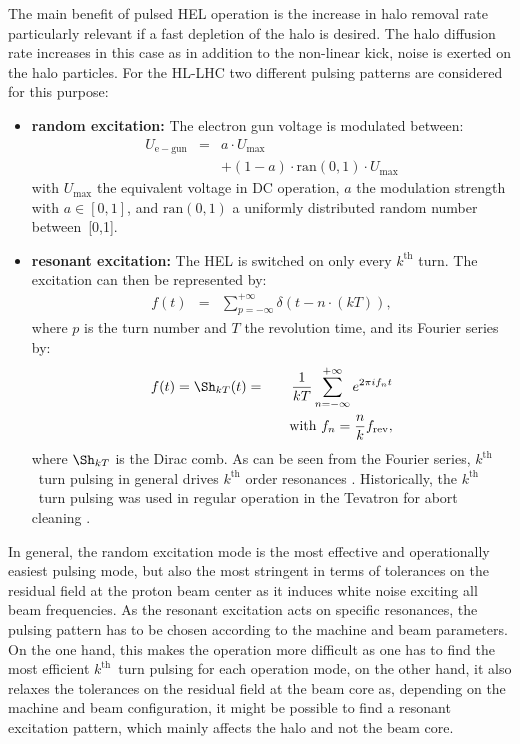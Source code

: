 \documentclass[%
 reprint,
 amsmath,amssymb,
 aps,
prstab,
]{revtex4-1}
\begin{document}
The main benefit of pulsed HEL operation is the increase in halo removal rate particularly relevant if a fast depletion of the halo is desired. The halo diffusion rate increases in this case as in addition to the non-linear kick, noise is exerted on the halo particles. For the HL-LHC two different pulsing patterns are considered for this purpose:
\begin{itemize}
	\item \textbf{random excitation:} The electron gun voltage is modulated between:
	\begin{eqnarray}
		U_{\mathrm{e-gun}}&=&a\cdot U_{\mathrm{max}}\\
		& &+(1-a)\cdot \mathrm{ran}(0,1)\cdot U_{\mathrm{max}}
	\end{eqnarray}
	with $U_{\mathrm{max}}$ the equivalent voltage in DC operation, $a$ the modulation strength with $a\in[0,1]$, and $\mathrm{ran}(0,1)$ a uniformly distributed random number between~[0,1].
	\item \textbf{resonant excitation:} The HEL is switched on only every $k^{\mathrm{th}}$ turn. The excitation can then be represented by:
	\begin{eqnarray}\label{intro:eqn:1}
	f(t)&=&\sum_{p=-\infty}^{+\infty}\delta(t-n\cdot(kT)),
	\end{eqnarray}
	where $p$ is the turn number and $T$ the revolution time, and its Fourier series by:
	\begin{eqnarray}\label{intro:eqn:2}
	f(t)=\Sh_{kT}(t)
	&=&\frac{1}{kT}\sum_{n=-\infty}^{+\infty}e^{2\pi i f_nt} \\
	& & \quad \text{with} \ f_n=\frac{n}{k}f_{\rm rev},
	\end{eqnarray}
	where $\Sh_{kT}$ is the Dirac comb. As can be seen from the Fourier series, $k^{\mathrm{th}}$~turn pulsing in general drives $k^{\mathrm{th}}$ order resonances \cite{md_sim_hel_res_ex_fitterer}. Historically, the $k^{\mathrm{th}}$~turn pulsing was used in regular operation in the Tevatron for abort cleaning \cite{hel_tevatron_abortgap_zhang}.
\end{itemize}
In general, the random excitation mode is the most effective and operationally easiest pulsing mode, but also the most stringent in terms of tolerances on the residual field at the proton beam center as it induces white noise exciting all beam frequencies. As the resonant excitation acts on specific resonances, the pulsing pattern has to be chosen according to the machine and beam parameters. On the one hand, this makes the operation more difficult as one has to find the most efficient $k^{\mathrm{th}}$~turn pulsing for each operation mode, on the other hand, it also relaxes the tolerances on the residual field at the beam core as, depending on the machine and beam configuration, it might be possible to find a resonant excitation pattern, which mainly affects the halo and not the beam core.
\end{document}
